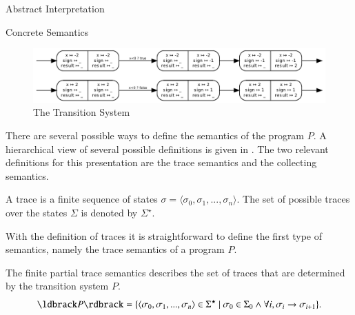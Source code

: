 \begin{chapter}{Abstract Interpretation}
\begin{section}{Concrete Semantics}
\begin{example}
			\begin{figure}
				\centering
				\includegraphics[width=\textwidth]{Graphs/Examples_ifExampleTransitionSystem.pdf}
				\caption{The Transition System}
				\label{figure:positivetransitionsystem}
			\end{figure}
		\end{example}

		There are several possible ways to define the semantics  of the program $P$. A hierarchical view of several possible definitions is given in \cite{cousot02}. The two relevant definitions for this presentation are the trace semantics and the collecting semantics.

		\begin{definition}[Trace]
			\label{definition:trace}
			A trace is a finite sequence of states $\sigma = \langle \sigma_0, \sigma_1, ..., \sigma_n \rangle$. The set of possible traces over the states $\Sigma$ is denoted by $\Sigma^\star$.
		\end{definition}

		With the definition of traces it is straightforward to define the first type of semantics, namely the trace semantics of a program $P$.

		\begin{definition}
			\label{definition:tracesemantics}
			The finite partial trace semantics describes the set of traces that are determined by the transition system $P$.
			\begin{equation}
				\concrete{P} = \{\langle \sigma_0, \sigma_1, ..., \sigma_n \rangle \in \Sigma^\star \ | \ \sigma_0 \in \Sigma_0 \land \forall i, \sigma_i \to \sigma_{i+1} \}.
				\label{eq:tracesemantics}
			\end{equation}
		\end{definition}


\end{section}
\end{chapter}
